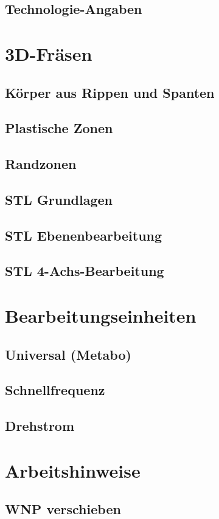 \documentclass[14pt,a4paper]{book}
\begin{document}
		\subsection{Technologie-Angaben} 
	\section{3D-Fräsen}
		\subsection{Körper aus Rippen und Spanten} 
		\subsection{Plastische Zonen} 
		\subsection{Randzonen} 
		\subsection{STL Grundlagen} 
		\subsection{STL Ebenenbearbeitung} 
		\subsection{STL 4-Achs-Bearbeitung}
	\section{Bearbeitungseinheiten} 
		\subsection{Universal (Metabo)} 
		\subsection{Schnellfrequenz} 
		\subsection{Drehstrom} 	 
	\section{Arbeitshinweise}
		\subsection{WNP verschieben} 
\end{document}

